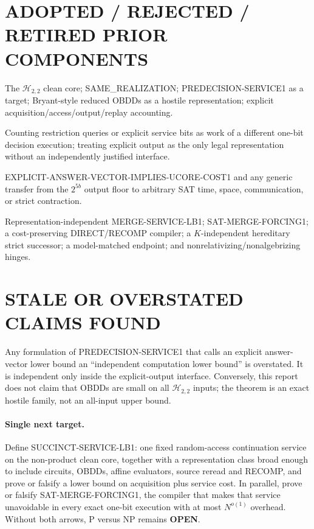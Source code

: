 \documentclass[11pt]{article}
\begin{document}
\section{ADOPTED / REJECTED / RETIRED PRIOR COMPONENTS}
\begin{description}[style=nextline,leftmargin=0pt,labelindent=0pt]
\item[ADOPTED.] The $\mathcal H_{2,2}$ clean core; SAME\_REALIZATION;
PREDECISION-SERVICE1 as a target; Bryant-style reduced OBDDs as a hostile
representation; explicit acquisition/access/output/replay accounting.
\item[REJECTED.] Counting restriction queries or explicit service bits as
work of a different one-bit decision execution; treating explicit output as
the only legal representation without an independently justified interface.
\item[FALSIFIED/RETIRED.] \textsf{EXPLICIT-ANSWER-VECTOR-IMPLIES-UCORE-COST1}
and any generic transfer from the $2^{5b}$ output floor to arbitrary SAT
time, space, communication, or strict contraction.
\item[OPEN.] Representation-independent \textsf{MERGE-SERVICE-LB1};
\textsf{SAT-MERGE-FORCING1}; a cost-preserving DIRECT/RECOMP compiler; a
$K$-independent hereditary strict successor; a model-matched endpoint; and
nonrelativizing/nonalgebrizing hinges.
\end{description}

\section{STALE OR OVERSTATED CLAIMS FOUND}
Any formulation of PREDECISION-SERVICE1 that calls an explicit answer-vector
lower bound an ``independent computation lower bound'' is overstated.  It is
independent only inside the explicit-output interface.  Conversely, this
report does not claim that OBDDs are small on all $\mathcal H_{2,2}$ inputs;
the theorem is an exact hostile family, not an all-input upper bound.

\paragraph{Single next target.}
Define \textsf{SUCCINCT-SERVICE-LB1}: one fixed random-access continuation
service on the non-product clean core, together with a representation class
broad enough to include circuits, OBDDs, affine evaluators, source reread and
RECOMP, and prove or falsify a lower bound on acquisition plus service cost.
In parallel, prove or falsify \textsf{SAT-MERGE-FORCING1}, the compiler that
makes that service unavoidable in every exact one-bit execution with at most
$N^{o(1)}$ overhead.  Without both arrows, P versus NP remains
\textbf{OPEN}.
\end{document}
